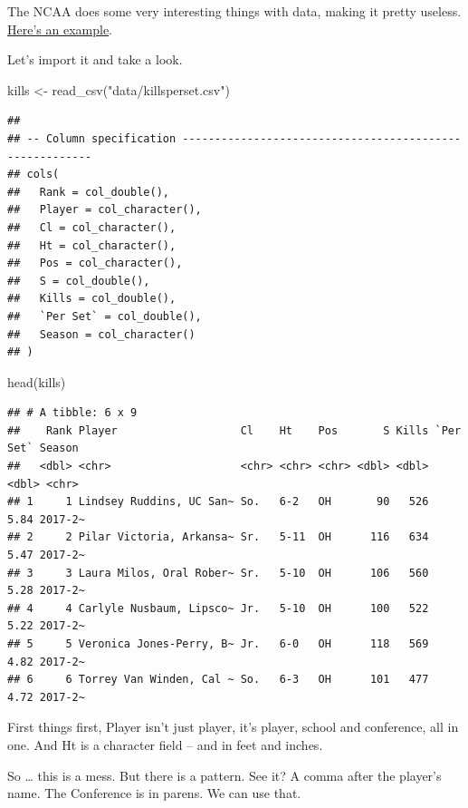 \documentclass[
]{book}
\newenvironment{Shaded}{\begin{snugshade}}{\end{snugshade}}
\newcommand{\FunctionTok}[1]{\textcolor[rgb]{0.00,0.00,0.00}{#1}}
\newcommand{\NormalTok}[1]{#1}
\newcommand{\OtherTok}[1]{\textcolor[rgb]{0.56,0.35,0.01}{#1}}
\newcommand{\StringTok}[1]{\textcolor[rgb]{0.31,0.60,0.02}{#1}}
\begin{document}
The NCAA does some very interesting things with data, making it pretty useless. \href{https://unl.box.com/s/kxjh8k7bm95i8eeovao18nqiky860j1s}{Here's an example}.

Let's import it and take a look.

\begin{Shaded}
\begin{Highlighting}[]
\NormalTok{kills }\OtherTok{\textless{}{-}} \FunctionTok{read\_csv}\NormalTok{(}\StringTok{"data/killsperset.csv"}\NormalTok{)}
\end{Highlighting}
\end{Shaded}

\begin{verbatim}
## 
## -- Column specification --------------------------------------------------------
## cols(
##   Rank = col_double(),
##   Player = col_character(),
##   Cl = col_character(),
##   Ht = col_character(),
##   Pos = col_character(),
##   S = col_double(),
##   Kills = col_double(),
##   `Per Set` = col_double(),
##   Season = col_character()
## )
\end{verbatim}

\begin{Shaded}
\begin{Highlighting}[]
\FunctionTok{head}\NormalTok{(kills)}
\end{Highlighting}
\end{Shaded}

\begin{verbatim}
## # A tibble: 6 x 9
##    Rank Player                   Cl    Ht    Pos       S Kills `Per Set` Season 
##   <dbl> <chr>                    <chr> <chr> <chr> <dbl> <dbl>     <dbl> <chr>  
## 1     1 Lindsey Ruddins, UC San~ So.   6-2   OH       90   526      5.84 2017-2~
## 2     2 Pilar Victoria, Arkansa~ Sr.   5-11  OH      116   634      5.47 2017-2~
## 3     3 Laura Milos, Oral Rober~ Sr.   5-10  OH      106   560      5.28 2017-2~
## 4     4 Carlyle Nusbaum, Lipsco~ Jr.   5-10  OH      100   522      5.22 2017-2~
## 5     5 Veronica Jones-Perry, B~ Jr.   6-0   OH      118   569      4.82 2017-2~
## 6     6 Torrey Van Winden, Cal ~ So.   6-3   OH      101   477      4.72 2017-2~
\end{verbatim}

First things first, Player isn't just player, it's player, school and conference, all in one. And Ht is a character field -- and in feet and inches.

So \ldots{} this is a mess. But there is a pattern. See it? A comma after the player's name. The Conference is in parens. We can use that.
\end{document}
